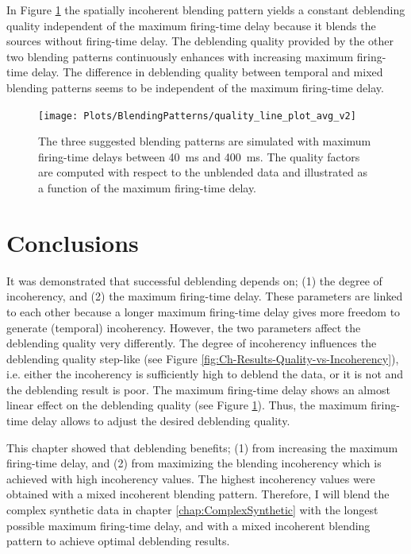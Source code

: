 In Figure \ref{fig:Ch-Results-QualityFactors} the spatially incoherent blending pattern yields a constant deblending quality independent of the maximum firing-time delay because it blends the sources without firing-time delay. The deblending quality provided by the other two blending patterns continuously enhances with increasing maximum firing-time delay. The difference in deblending quality between temporal and mixed blending patterns seems to be independent of the maximum firing-time delay.

\begin{figure}
	\centering
	\texttt{[image: Plots/BlendingPatterns/quality\_line\_plot\_avg\_v2]}
	\caption{The three suggested blending patterns are simulated with maximum firing-time delays between \SI{40}{\milli\second} and \SI{400}{\milli\second}. The quality factors are computed with respect to the unblended data and illustrated as a function of the maximum firing-time delay.}
	\label{fig:Ch-Results-QualityFactors}
\end{figure}
			
			

\section{Conclusions}	\label{fig:Ch-Incoherency-Conclusions}

It was demonstrated that successful deblending depends on; (1) the degree of incoherency, and (2) the maximum firing-time delay. These parameters are linked to each other because a longer maximum firing-time delay gives more freedom to generate (temporal) incoherency. However, the two parameters affect the deblending quality very differently. The degree of incoherency influences the deblending quality step-like (see Figure \ref{fig:Ch-Results-Quality-vs-Incoherency}), i.e. either the incoherency is sufficiently high to deblend the data, or it is not and the deblending result is poor. The maximum firing-time delay shows an almost linear effect on the deblending quality (see Figure \ref{fig:Ch-Results-QualityFactors}). Thus, the maximum firing-time delay allows to adjust the desired deblending quality.

This chapter showed that deblending benefits; (1) from increasing the maximum firing-time delay, and (2) from maximizing the blending incoherency which is achieved with high incoherency values. The highest incoherency values were obtained with a mixed incoherent blending pattern. Therefore, I will blend the complex synthetic data in chapter \ref{chap:ComplexSynthetic} with the longest possible maximum firing-time delay, and with a mixed incoherent blending pattern to achieve optimal deblending results.

